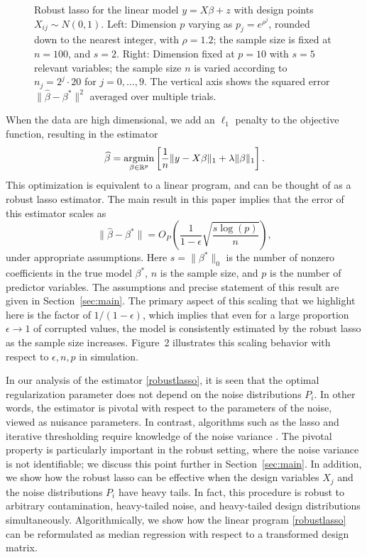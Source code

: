 \begin{figure}[t]
\begin{center}
\begin{tabular}{cc}
    \end{tabular}
  \end{center}
\caption{Robust lasso for the linear model  $y=X\beta + z$ with design points $X_{ij}\sim N(0,1)$.
Left: Dimension $p$ varying as $p_{j} = e^{\rho^j}$, rounded down to the nearest integer, with $\rho=1.2$; the sample size is fixed at $n=100$, and $s=2$. Right: Dimension fixed at $p=10$ with $s=5$ relevant variables; the sample size $n$ is varied according to
$n_j = 2^j \cdot 20$ for $j=0,\ldots, 9$. The vertical axis shows the squared error $\|\hat \beta - \beta^*\|^2$ averaged over multiple trials.}
\end{figure}

When the data are high dimensional, we add an $\ell_1$ penalty to the objective function, resulting in the estimator
\begin{equation}
  \wh{\beta}=\argmin_{\beta\in\mathbb{R}^p}\left[\frac{1}{n}\|y-X\beta\|_1+\lambda\|\beta\|_1\right].
  \label{robustlasso}
\end{equation}
This optimization is equivalent to a linear program, and can be thought of as a robust lasso estimator. The main result in this paper implies that the error of this estimator scales as
\begin{equation}
  \|\hat \beta - \beta^*\|  = O_P\left(\frac{1}{1-\epsilon} \sqrt{\frac{s\log(p)}{n}}\right),
\end{equation}
under appropriate assumptions.
Here $s = \|\beta^*\|_0$ is the number of nonzero coefficients in the true model $\beta^*$, $n$ is the sample size, and $p$ is the number of predictor variables. The assumptions and precise statement of this result are given in Section~\ref{sec:main}. The primary aspect of this scaling that we highlight here is the factor of $1/(1-\epsilon)$, which implies that even for a large proportion $\epsilon \to 1$ of corrupted values, the model is consistently estimated by the robust lasso as the sample size increases. Figure~2 illustrates this scaling behavior with respect to $\epsilon, n, p$ in simulation.

In our analysis of the estimator \eqref{robustlasso}, it is seen that the optimal regularization parameter does not depend on the noise distributions $P_i$. In other words, the
estimator is pivotal with respect to the parameters of the noise, viewed as nuisance parameters.
In contrast, algorithms such as the lasso and iterative thresholding  require knowledge of the noise variance \citep{bickel2009simultaneous,suggala2019adaptive}.
The pivotal property is particularly important in the robust setting, where the
noise variance is not identifiable; we discuss this point further in Section~\ref{sec:main}.
In addition, we show how the robust lasso can be effective when the design variables $X_j$ and the noise distributions $P_i$ have heavy tails.
In fact, this procedure is robust to arbitrary contamination, heavy-tailed noise, and heavy-tailed design distributions simultaneously. Algorithmically, we show how the linear program \eqref{robustlasso} can be reformulated as median regression with respect to a transformed design matrix.

